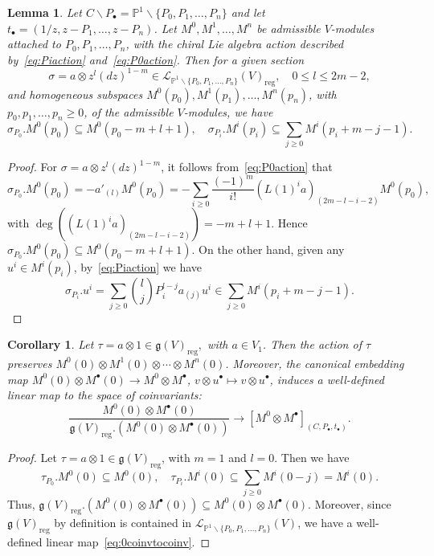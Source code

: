 \documentclass[12pt,a4paper,reqno]{amsart}
\numberwithin{equation}{section}
\newtheorem{lemma}[theorem]{Lemma}
\newtheorem{corollary}[theorem]{Corollary}
\theoremstyle{definition}
\newcommand{\g}{\mathfrak{g}}
\renewcommand{\P}{\mathbb{P}}
\def\bs{\backslash}
\def\o{\otimes}
\def\ra{\rightarrow}
\def\ssq{\subseteq}
\def\ds{\dots}
\def\si{\sigma}
\def\reg{\mathrm{reg}}
\begin{document}
\begin{lemma}\label{lm:regdegree}
Let $C\bs P_\bullet=\P^1\bs\{P_0,P_1,\ds ,P_n\}$ and let $t_\bullet=(1/z,z-P_1,\ds ,z-P_n)$. Let $M^0,M^1,\ds, M^n$ be admissible $V$-modules attached to $P_0,P_1,\ds,P_n$, with the chiral Lie algebra action described by~\eqref{eq:Piaction} and~\eqref{eq:P0action}. Then for a given section
\[
\si=a\o z^l (dz)^{1-m}\in \mathcal{L}_{\P^1\bs \{P_0,P_1,\ds ,P_n\}}(V)_\reg,\quad 0\leq l\leq 2m-2,
\]
and homogeneous subspaces $M^0(p_0),M^1(p_1),\ds, M^n(p_n)$, with $p_0,p_1,\ds,p_n\geq 0$, of the admissible $V$-modules, we have
\[
\si_{P_0}.M^0(p_0)\ssq M^0(p_0-m+l+1),\quad  \si_{P_i}.M^i(p_i)\ssq \sum_{j\geq 0}M^i(p_i+m-j-1).
\]

\end{lemma}
\begin{proof}
For $\si=a\o z^l (dz)^{1-m}$, it follows from~\eqref{eq:P0action} that
\[
\si_{P_0}.M^0(p_0)=-a'_{(l)}M^0(p_0)=-\sum_{i\geq 0} \frac{(-1)^m}{i!} (L(1)^ia)_{(2m-l-i-2)}M^0(p_0),
\]
with $\deg((L(1)^ia)_{(2m-l-i-2)})=-m+l+1$. Hence $\si_{P_0}.M^0(p_0)\ssq M^0(p_0-m+l+1)$. On the other hand, given any $u^i\in M^i(p_i)$, by~\eqref{eq:Piaction} we have
\[
\si_{P_i}.u^i=\sum_{j\geq 0} \binom{l}{j} P_i^{l-j} a_{(j)}u^i\in \sum_{j\geq 0} M^i(p_i+m-j-1).
\]
\end{proof}

\begin{corollary}\label{coro:surjmap}
Let
$\tau=a\o 1\in \g(V)_\reg,$ with $a\in V_1$.
Then the action of $\tau$ preserves $M^0(0)\o M^1(0)\o\cdots\o M^n(0)$. Moreover, the canonical embedding map $M^0(0)\o M^\bullet(0)\ra M^0\o M^\bullet$, $v\o u^\bullet\mapsto v\o u^\bullet$, induces a well-defined linear map to the space of coinvariants:
\begin{equation}\label{eq:0coinvtocoinv}
\frac{M^0(0)\o M^\bullet(0)}{\g(V)_\reg.(M^0(0)\o M^\bullet(0))}\ra [M^0\o M^\bullet]_{(C,P_\bullet,t_\bullet)}.
\end{equation}
\end{corollary}
\begin{proof}
    Let $\tau=a\o 1\in \g(V)_\reg$, with $m=1$ and $l=0$. Then we have
\[
\tau_{P_0}. M^0(0)\ssq M^0(0),\quad \tau_{P_i}.M^i(0)\ssq \sum_{j\geq 0} M^i(0-j)=M^i(0).
\]
Thus, $\g(V)_\reg. (M^0(0)\o M^\bullet(0))\ssq M^0(0)\o M^\bullet(0)$. Moreover, since $\g(V)_\reg$ by definition is contained in $\mathcal{L}_{\P^1\bs \{P_0,P_1,\ds ,P_n\}}(V)$, we have a well-defined linear map~\eqref{eq:0coinvtocoinv}.
\end{proof}
\end{document}
